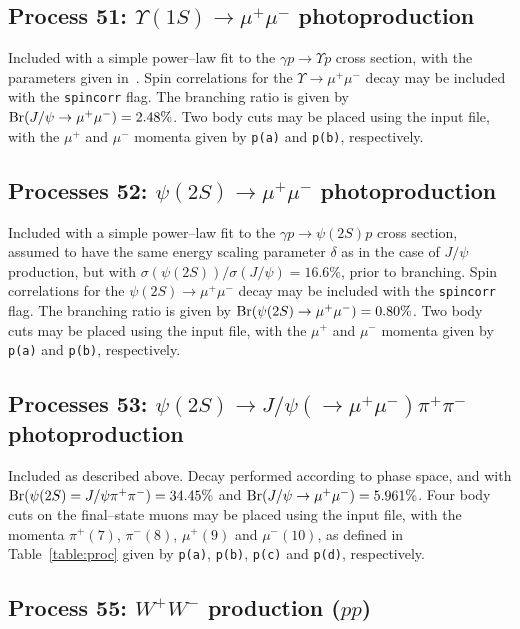 \documentclass[12pt]{article}
\begin{document}
\subsection{Process 51: $\Upsilon(1S) \to \mu^+\mu^-$ photoproduction}

Included with a simple power--law fit to the $\gamma p\to \Upsilon p$ cross section, with the parameters given in~\cite{Harland-Lang:2015cta}. 
Spin correlations for the $\Upsilon\to \mu^+\mu^-$ decay may be included with the \texttt{spincorr} flag. The branching ratio is given by 
${\rm Br}(J/\psi \to \mu^+\mu^-)=2.48\%$. Two body cuts may be placed using the input file, with the $\mu^+$ and $\mu^-$  momenta given by 
\texttt{p(a)} and \texttt{p(b)}, respectively.

\subsection{Processes 52: $\psi(2S)\to \mu^+\mu^-$ photoproduction}

Included with a simple power--law fit to the $\gamma p\to \psi(2S) p$ cross section, assumed to have the same energy scaling parameter $\delta$ 
as in the case of $J/\psi$ production, but with $\sigma(\psi(2S))/\sigma(J/\psi)=16.6\%$, prior to branching. Spin correlations for the
 $\psi(2S)\to \mu^+\mu^-$ decay may be included with the \texttt{spincorr} flag. The branching ratio is given by 
 ${\rm Br}(\psi(2S) \to \mu^+\mu^-)=0.80\%$. Two body cuts may be placed using the input file, with the $\mu^+$ and $\mu^-$ momenta given by 
 \texttt{p(a)} and \texttt{p(b)}, respectively.

\subsection{Processes 53: $\psi(2S)\to J/\psi(\to \mu^+\mu^-) \pi^+\pi^-$ photoproduction}

Included as described above. Decay performed according to phase space, and with ${\rm Br}(\psi(2S)=J/\psi\pi^+\pi^-)=34.45\%$ and 
${\rm Br}(J/\psi \to \mu^+\mu^-)=5.961\%$. Four body cuts on the final--state muons may be placed using the input file, with the momenta 
$\pi^+(7)$, $\pi^-(8)$, $\mu^+(9)$ and $\mu^-(10)$, as defined in Table~\ref{table:proc} given by \texttt{p(a)}, \texttt{p(b)}, \texttt{p(c)} 
and \texttt{p(d)}, respectively.


\subsection{Process 55: $W^+W^-$ production ($pp$)}
\end{document}
